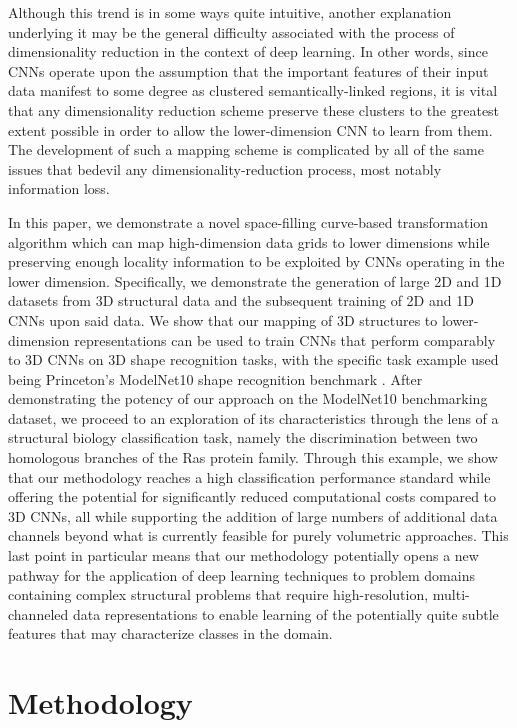 \documentclass{article}
\begin{document}
Although this trend is in some ways quite intuitive, another explanation underlying it may be the general difficulty associated with the process of dimensionality reduction in the context of deep learning. In other words, since CNNs operate upon the assumption that the important features of their input data manifest to some degree as clustered semantically-linked regions, it is vital that any dimensionality reduction scheme preserve these clusters to the greatest extent possible in order to allow the lower-dimension CNN to learn from them. The development of such a mapping scheme is complicated by all of the same issues that bedevil any dimensionality-reduction process, most notably information loss. 

In this paper, we demonstrate a novel space-filling curve-based transformation algorithm which can map high-dimension data grids to lower dimensions while preserving enough locality information to be exploited by CNNs operating in the lower dimension. Specifically, we demonstrate the generation of large 2D and 1D datasets from 3D structural data and the subsequent training of 2D and 1D CNNs upon said data. We show that our mapping of 3D structures to lower-dimension representations can be used to train CNNs that perform comparably to 3D CNNs on 3D shape recognition tasks, with the specific task example used being Princeton’s ModelNet10 shape recognition benchmark \cite{wu20153d}. After demonstrating the potency of our approach on the ModelNet10 benchmarking dataset, we proceed to an exploration of its characteristics through the lens of a structural biology classification task, namely the discrimination between two homologous branches of the Ras protein family. Through this example, we show that our methodology reaches a high classification performance standard while offering the potential for significantly reduced computational costs compared to 3D CNNs, all while supporting the addition of large numbers of additional data channels beyond what is currently feasible for purely volumetric approaches. This last point in particular means that our methodology potentially opens a new pathway for the application of deep learning techniques to problem domains containing complex structural problems that require high-resolution, multi-channeled data representations to enable learning of the potentially quite subtle features that may characterize classes in the domain. 

\section{Methodology}
\end{document}

